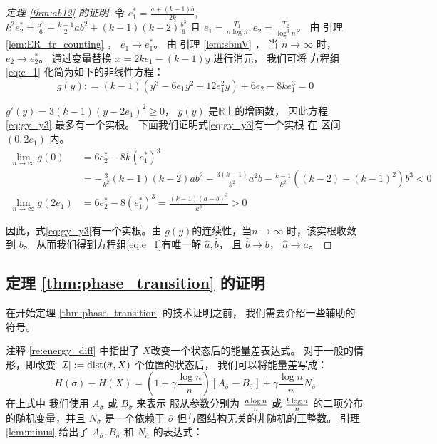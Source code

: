 \begin{proof}[定理 \ref{thm:ab12} 的证明]
	令 $e^*_1 = \frac{a+(k-1)b}{2k}$, $k^2 e^*_2 = \frac{a^3}{6} + \frac{k-1}{2}ab^2 + (k-1)(k-2)\frac{b^3}{6}$
	且 $e_1 = \frac{T_1}{n\log n}, e_2 = \frac{T_2}{\log^3 n}$。
	由 引理
  \ref{lem:ER_tr_counting} ， $e_1 \to e^*_1$。
	由 引理 \ref{lem:sbmV} ， 当 $n\to \infty$ 时，
  $e_2 \to e^*_2$。
	通过变量替换 $x=2ke_1 - (k-1)y$ 进行消元，
  我们可将
  方程组\eqref{eq:e_1}
  化简为如下的非线性方程：
\begin{equation}\label{eq:gy_y3}
g(y): = (k-1)(y^3 - 6 e_1 y^2 + 12 e_1^2 y) + 6 e_2 - 8 k e_1^3 = 0
\end{equation}

$g'(y) = 3(k-1)(y-2e_1)^2 \geq 0 $，
$g(y)$ 是$\mathbb{R}$上的增函数，
因此方程\eqref{eq:gy_y3} 最多有一个实根。
下面我们证明式\eqref{eq:gy_y3}有一个实根
在 区间 $(0, 2e_1)$ 内。
\begin{align*}
\lim_{n\to \infty}g(0) &=  6e^*_2 - 8k(e^*_1)^3  \\
&=-\frac{3}{k^2}(k-1)(k-2)ab^2-\frac{3(k-1)}{k^2}a^2b - \frac{k-1}{k^2} ((k-2)-(k-1)^2)b^3 < 0 \\
\lim_{n\to \infty}g(2e_1) &= 6e^*_2 - 8(e^*_1)^3 = \frac{(k-1)(a-b)^3}{k^3} > 0
\end{align*}

因此，式\eqref{eq:gy_y3}有一个实根。由 $g(y)$的连续性，当$n\to \infty $ 时，该实根收敛到 $b$。
从而我们得到方程组\eqref{eq:e_1}有唯一解 $\hat{a},\hat{b}$，
且
$\hat{b} \to b$， $\hat{a} \to a$。
\end{proof}




\subsection{定理 \ref{thm:phase_transition} 的证明}
\label{sec:appendix_theorem_proof_phase_trans}

在开始定理 \ref{thm:phase_transition} 的技术证明之前，
我们需要介绍一些辅助的
符号。

注释 \ref{re:energy_diff} 中指出了
$X$改变一个状态后的能量差表达式。
对于一般的情形，即改变
$|\mathcal{I}|:=\operatorname{dist}(\bar{\sigma}, X)$
个位置的状态后，
我们可以将能量差写成：
\begin{equation}\label{eq:Hgeneral}
H(\bar{\sigma}) - H(X)=
\left(1 + \gamma \frac{ \log n}{n} \right)[A_{\bar{\sigma}} - B_{\bar{\sigma}}] + \gamma\frac{ \log n}{n} N_{\bar{\sigma}}
\end{equation}
在上式中 我们使用
$A_{\bar{\sigma}}$ 或
$B_{\bar{\sigma}}$ 来表示
服从参数分别为 $\frac{a \log n}{n}$ 或 $\frac{b \log n}{n}$ 的二项分布的随机变量，并且
$N_{\bar{\sigma}}$ 是一个依赖于 $\bar{\sigma}$ 但与图结构无关的非随机的正整数。
引理 \ref{lem:minus}  给出了 $A_{\bar{\sigma}}, B_{\bar{\sigma}}$ 和 $N_{\bar{\sigma}}$
的表达式：

